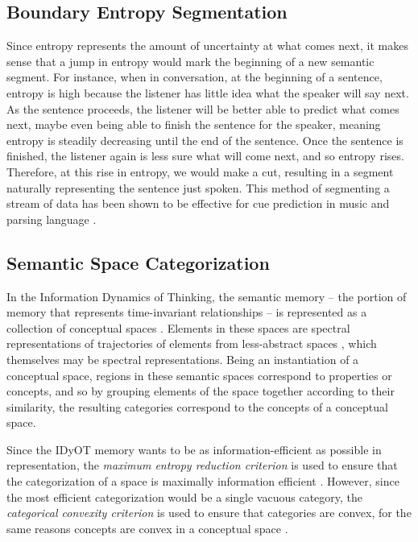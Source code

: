 \subsection{Boundary Entropy Segmentation}
\label{subsection:boundary-entropy-segmentation}

Since entropy represents the amount of uncertainty at what comes next, it makes sense that a jump in entropy would mark the beginning of a new semantic segment.  For instance, when in conversation, at the beginning of a sentence, entropy is high because the listener has little idea what the speaker will say next. As the sentence proceeds, the listener will be better able to predict what comes next, maybe even being able to finish the sentence for the speaker, meaning entropy is steadily decreasing until the end of the sentence.  Once the sentence is finished, the listener again is less sure what will come next, and so entropy rises.  Therefore, at this rise in entropy, we would make a cut, resulting in a segment naturally representing the sentence just spoken.  This method of segmenting a stream of data has been shown to be effective for cue prediction in music \citep{wiggins2010cue} and parsing language \citep{sproat1996stochastic}.

\subsection{Semantic Space Categorization}
\label{section:semantic-space-categorization}

In the Information Dynamics of Thinking, the semantic memory -- the portion of memory that represents time-invariant relationships -- is represented as a collection of conceptual spaces \citep{gardenfors2004conceptual}.  Elements in these spaces are spectral representations of trajectories of elements from less-abstract spaces \citep{chella2015cognitive}, which themselves may be spectral representations.  Being an instantiation of a conceptual space, regions in these semantic spaces correspond to properties or concepts, and so by grouping elements of the space together according to their similarity, the resulting categories correspond to the concepts of a conceptual space.

Since the IDyOT memory wants to be as information-efficient as possible in representation, the \textit{maximum entropy reduction criterion} is used to ensure that the categorization of a space is maximally information efficient \citep{quinlan1983learning}.  However, since the most efficient categorization would be a single vacuous category, the \textit{categorical convexity criterion} is used to ensure that categories are convex, for the same reasons concepts are convex in a conceptual space \citep{gardenfors2004conceptual}.

